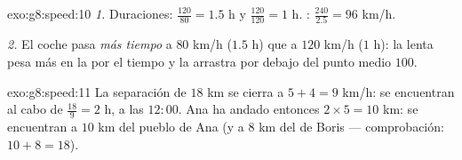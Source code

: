 \begin{solution}{exo:g8:speed:10}
\emph{1.} Duraciones: $\frac{120}{80} = 1.5$ h y $\frac{120}{120} = 1$
h. : $\frac{240}{2.5} = 96$ km/h.

\emph{2.} El coche pasa \emph{más tiempo} a $80$ km/h ($1.5$ h)
que a $120$ km/h ($1$ h): la  lenta pesa más en la
 por el tiempo y la arrastra por debajo del punto medio $100$.
\end{solution}

\begin{solution}{exo:g8:speed:11}
La separación de $18$ km se cierra a $5 + 4 = 9$ km/h: se encuentran al cabo de
$\frac{18}{9} = 2$ h, a las $12{:}00$. Ana ha andado entonces
$2 \times 5 = 10$ km: se encuentran a $10$ km del pueblo de Ana (y a
$8$ km del de Boris --- comprobación: $10 + 8 = 18$).
\end{solution}

